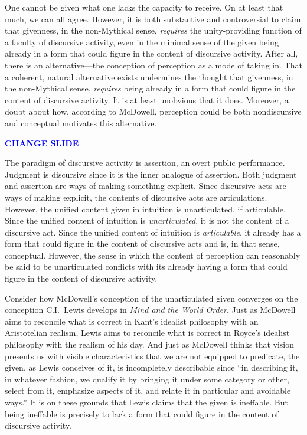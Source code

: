\documentclass[12pt]{article}
\newcommand{\change}{\textcolor{blue}{\textbf{CHANGE SLIDE}}}
\begin{document}
One cannot be given what one lacks the capacity to receive. On at least that much, we can all agree. However, it is both substantive and controversial to claim that givenness, in the non-Mythical sense, \emph{requires} the unity-providing function of a faculty of discursive activity, even in the minimal sense of the given being already in a form that could figure in the content of discursive activity. After all, there is an alternative---the conception of perception as a mode of taking in. That a coherent, natural alternative exists undermines the thought that givenness, in the non-Mythical sense, \emph{requires} being already in a form that could figure in the content of discursive activity. It is at least unobvious that it does. Moreover, a doubt about how, according to McDowell, perception could be both nondiscursive and conceptual motivates this alternative.

\change

The paradigm of discursive activity is assertion, an overt public performance. Judgment is discursive since it is the inner analogue of assertion. Both judgment and assertion are ways of making something explicit. Since discursive acts are ways of making explicit, the contents of discursive acts are articulations. However, the unified content given in intuition is unarticulated, if articulable. Since the unified content of intuition is \emph{unarticulated}, it is not the content of a discursive act. Since the unified content of intuition is \emph{articulable}, it already has a form that could figure in the content of discursive acts and is, in that sense, conceptual. However, the sense in which the content of perception can reasonably be said to be unarticulated conflicts with its already having a form that could figure in the content of discursive activity.

Consider how McDowell's conception of the unarticulated given converges on the conception C.I.\ Lewis develops in \emph{Mind and the World Order}. Just as McDowell aims to reconcile what is correct in Kant's idealist philosophy with an Aristotelian realism, Lewis aims to reconcile what is correct in Royce's idealist philosophy with the realism of his day. And just as McDowell thinks that vision presents us with visible characteristics that we are not equipped to predicate, the given, as Lewis conceives of it, is incompletely describable since ``in describing it, in whatever fashion, we qualify it by bringing it under some category or other, select from it, emphasize aspects of it, and relate it in particular and avoidable ways.'' It is on these grounds that Lewis claims that the given is ineffable. But being ineffable is precisely to lack a form that could figure in the content of discursive activity.
\end{document}

